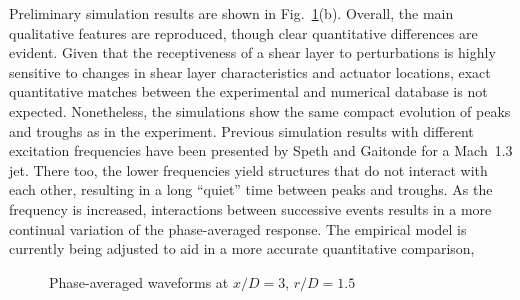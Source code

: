 \documentclass[english]{aiaa-tc}
\begin{document}
Preliminary simulation results are shown in Fig.~\ref{phase}(b).
Overall, the main qualitative features are reproduced, though clear
quantitative differences are evident.  Given that the receptiveness of
a shear layer to perturbations is highly sensitive to changes in shear
layer characteristics and actuator locations, exact quantitative
matches between the experimental and numerical database is not
expected.  Nonetheless, the simulations show the same compact
evolution of peaks and troughs as in the experiment.  Previous
simulation results with different excitation frequencies have been
presented by Speth and Gaitonde\cite{spethASME2013} for a Mach~1.3 jet.  There too,
the lower frequencies yield structures that do not interact with each
other, resulting in a long ``quiet'' time between peaks and troughs.
As the frequency is increased, interactions between successive events
results in a more continual variation of the phase-averaged response.
The empirical model is
currently  being adjusted to aid in a more accurate quantitative comparison,  
\begin{figure}
\centering{}\caption{Phase-averaged waveforms at $x/D = 3$, $r/D = 1.5$}\label{phase}
\end{figure}
\end{document}
